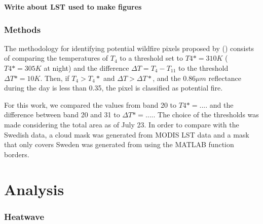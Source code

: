 \documentclass[a4paper, article, oneside, UKenglish]{memoir}
\newcommand{\0}{\mathbf{0}}
\newcommand{\1}{\mathbf{1}}
\begin{document}
\textbf{Write about LST used to make figures}
\subsection{Methods}

The methodology for identifying potential wildfire pixels proposed by \citeauthor{2018_sweden_wildfires} (\citeyear{giglio_et_al_2016}) consists of comparing the temperatures of $T_4$ to a threshold set to $T4* = 310 K$ ($T4* = 305 K$ at night) and the difference $\Delta T = T_4 - T_{11}$ to the threshold $\Delta T* = 10 K$. Then, if $T_4 > T_4*$ and $\Delta T > \Delta T *$, and the $0.86 \mu m$ reflectance during the day is less than 0.35, the pixel is classified as potential fire. 

For this work, we compared the values from band 20 to $T4* = ....$ and the difference between band 20 and 31 to $\Delta T* = ....$. The choice of the thresholds was made considering the total area as of July 23. In order to compare with the Swedish data, a cloud mask was generated from MODIS LST data and a mask that only covers Sweden was generated from using the MATLAB function borders.

\chapter{Analysis}

\subsection{Heatwave}
\end{document}
